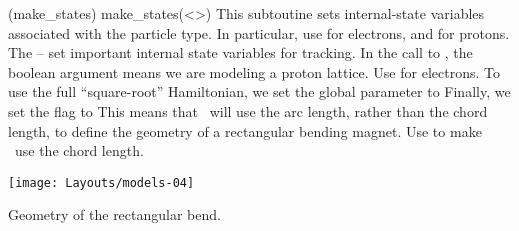 %
\glossary[ptccmds](make\_states)%
  {make\_states(<\textit{}>)}%
  {This subtoutine sets internal-state variables associated
   with the particle type.
   In particular, use  for electrons,
   and  for protons.}
%
The -- set important
internal state variables for tracking. In the call to
, the boolean argument  means we are
modeling a proton lattice. Use  for electrons.%
To use the full ``square-root'' Hamiltonian, we set the global
parameter  to  
%
Finally, we set the flag  to  This
means that \PTC\ will use the arc length, rather than the chord
length, to define the geometry of a rectangular bending magnet.
Use  to make \PTC\ use the chord length. 

\begin{marginfigure}\forcerectofloat
  \texttt{[image: Layouts/models-04]}
  \caption{Geometry of the rectangular bend.}
  \label{fig:rect.bend}
\end{marginfigure}


